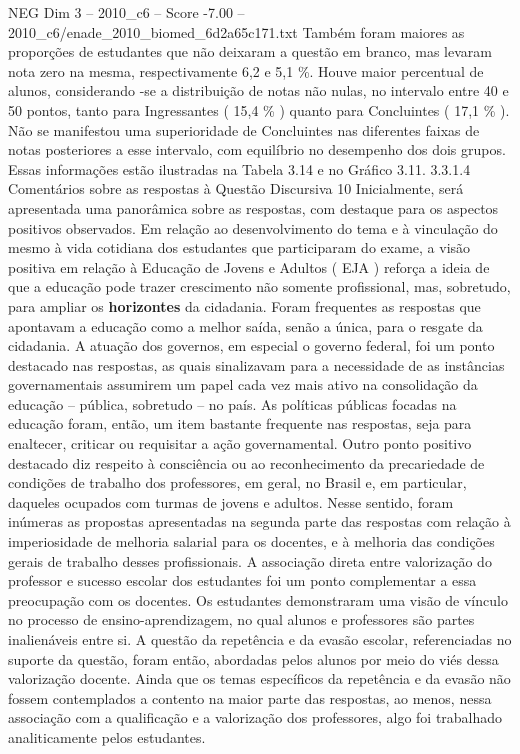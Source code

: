 \begin{textsample}{NEG Dim 3 – 2010\_c6 – Score -7.00 – 2010\_c6/enade\_2010\_biomed\_6d2a65c171.txt}
Também foram maiores as proporções de estudantes que não deixaram a questão em branco, mas levaram nota zero na mesma, respectivamente 6,2 e 5,1 \%.
Houve maior percentual de alunos, considerando -se a distribuição de notas não nulas, no intervalo entre 40 e 50 pontos, tanto para Ingressantes ( 15,4 \% ) quanto para Concluintes ( 17,1 \% ).
Não se manifestou uma superioridade de Concluintes nas diferentes faixas de notas posteriores a esse intervalo, com equilíbrio no desempenho dos dois grupos.
Essas informações estão ilustradas na Tabela 3.14 e no Gráfico 3.11. 3.3.1.4 Comentários sobre as respostas à Questão Discursiva 10 Inicialmente, será apresentada uma panorâmica sobre as respostas, com destaque para os aspectos positivos observados.
Em relação ao desenvolvimento do tema e à vinculação do mesmo à vida cotidiana dos estudantes que participaram do exame, a visão positiva em relação à Educação de Jovens e Adultos ( EJA ) reforça a ideia de que a educação pode trazer crescimento não somente profissional, mas, sobretudo, para ampliar os \textbf{horizontes} da cidadania.
Foram frequentes as respostas que apontavam a educação como a melhor saída, senão a única, para o resgate da cidadania.
A atuação dos governos, em especial o governo federal, foi um ponto destacado nas respostas, as quais sinalizavam para a necessidade de as instâncias governamentais assumirem um papel cada vez mais ativo na consolidação da educação – pública, sobretudo – no país.
As políticas públicas focadas na educação foram, então, um item bastante frequente nas respostas, seja para enaltecer, criticar ou requisitar a ação governamental.
Outro ponto positivo destacado diz respeito à consciência ou ao reconhecimento da precariedade de condições de trabalho dos professores, em geral, no Brasil e, em particular, daqueles ocupados com turmas de jovens e adultos.
Nesse sentido, foram inúmeras as propostas apresentadas na segunda parte das respostas com relação à imperiosidade de melhoria salarial para os docentes, e à melhoria das condições gerais de trabalho desses profissionais.
A associação direta entre valorização do professor e sucesso escolar dos estudantes foi um ponto complementar a essa preocupação com os docentes.
Os estudantes demonstraram uma visão de vínculo no processo de ensino-aprendizagem, no qual alunos e professores são partes inalienáveis entre si.
A questão da repetência e da evasão escolar, referenciadas no suporte da questão, foram então, abordadas pelos alunos por meio do viés dessa valorização docente.
Ainda que os temas específicos da repetência e da evasão não fossem contemplados a contento na maior parte das respostas, ao menos, nessa associação com a qualificação e a valorização dos professores, algo foi trabalhado analiticamente pelos estudantes.

\end{textsample}
